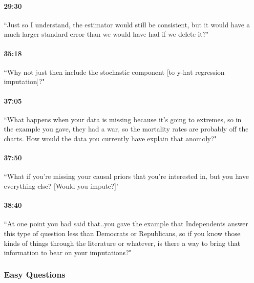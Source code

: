 \documentclass[11pt]{article}
\begin{document}
\paragraph{29:30} ``Just so I understand, the estimator would still be consistent, but it would have a much larger standard error than we would have had if we delete it?"

\paragraph{35:18} ``Why not just then include the stochastic component [to y-hat regression imputation]?"

\paragraph{37:05} ``What happens when your data is missing because it's going to extremes, so in the example you gave, they had a war, so the mortality rates are probably off the charts. How would the data you currently have explain that anomoly?"

\paragraph{37:50} ``What if you're missing your causal priors that you're interested in, but you have everything else? [Would you impute?]"

\paragraph{38:40} ``At one point you had said that..you gave the example that Independents answer this type of question less than Democrats or Republicans, so if you know those kinds of things through the literature or whatever, is there a way to bring that information to bear on your imputations?"

\subsubsection{Easy Questions}
\end{document}
